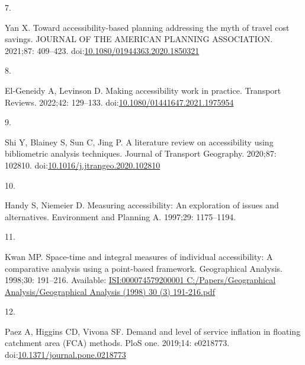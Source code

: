 \documentclass[10pt,letterpaper]{article}
\newlength{\cslhangindent}
\newlength{\csllabelwidth}
\newlength{\cslentryspacingunit} %
\newenvironment{CSLReferences}[2] %
 {%
  \setlength{\parindent}{0pt}
  \ifodd #1
  \let\oldpar\par
  \def\par{\hangindent=\cslhangindent\oldpar}
  \fi
  \setlength{\parskip}{#2\cslentryspacingunit}
 }%
 {}
\newcommand{\CSLLeftMargin}[1]{\parbox[t]{\csllabelwidth}{#1}}
\newcommand{\CSLRightInline}[1]{\parbox[t]{\linewidth - \csllabelwidth}{#1}\break}
\providecommand{\DIFaddbegin}{} %
\providecommand{\DIFaddend}{} %
\providecommand{\DIFdelbegin}{} %
\providecommand{\DIFdelend}{} %
\newcommand{\DIFscaledelfig}{0.5}
\newlength{\DIFdelgraphicswidth} %
\newlength{\DIFdelgraphicsheight} %
\newcommand{\DIFaddincludegraphics}[2][]{{\color{blue}\fbox{\DIFOincludegraphics[#1]{#2}}}} %
\newcommand{\DIFdelincludegraphics}[2][]{%
\sbox{\DIFdelgraphicsbox}{\DIFOincludegraphics[#1]{#2}}%
\settoboxwidth{\DIFdelgraphicswidth}{\DIFdelgraphicsbox} %
\settoboxtotalheight{\DIFdelgraphicsheight}{\DIFdelgraphicsbox} %
\scalebox{\DIFscaledelfig}{%
\parbox[b]{\DIFdelgraphicswidth}{\usebox{\DIFdelgraphicsbox}\\[-\baselineskip] \rule{\DIFdelgraphicswidth}{0em}}\llap{\resizebox{\DIFdelgraphicswidth}{\DIFdelgraphicsheight}{%
\setlength{\unitlength}{\DIFdelgraphicswidth}%
\begin{picture}(1,1)%
\thicklines\linethickness{2pt} %
{\color[rgb]{1,0,0}\put(0,0){\framebox(1,1){}}}%
{\color[rgb]{1,0,0}\put(0,0){\line( 1,1){1}}}%
{\color[rgb]{1,0,0}\put(0,1){\line(1,-1){1}}}%
\end{picture}%
}\hspace*{3pt}}} %
} %
\DeclareRobustCommand{\DIFaddbegin}{\DIFOaddbegin \let\includegraphics\DIFaddincludegraphics} %
\DeclareRobustCommand{\DIFaddend}{\DIFOaddend \let\includegraphics\DIFOincludegraphics} %
\DeclareRobustCommand{\DIFdelbegin}{\DIFOdelbegin \let\includegraphics\DIFdelincludegraphics} %
\DeclareRobustCommand{\DIFdelend}{\DIFOaddend \let\includegraphics\DIFOincludegraphics} %
\begin{document}
\begin{CSLReferences}{0}{0}
\leavevmode{}%
\CSLLeftMargin{7. }%
\CSLRightInline{Yan X. Toward accessibility-based planning addressing
the myth of travel cost savings. {JOURNAL} {OF} {THE} {AMERICAN}
{PLANNING} {ASSOCIATION}. 2021;87: 409--423.
doi:\href{https://doi.org/10.1080/01944363.2020.1850321}{10.1080/01944363.2020.1850321}}

\leavevmode{}%
\CSLLeftMargin{8. }%
\CSLRightInline{El-Geneidy A, Levinson D. Making accessibility work in
practice. Transport Reviews. 2022;42: 129--133.
doi:\href{https://doi.org/10.1080/01441647.2021.1975954}{10.1080/01441647.2021.1975954}}

\leavevmode{}%
\CSLLeftMargin{9. }%
\CSLRightInline{Shi Y, Blainey S, Sun C, Jing P. A literature review on
accessibility using bibliometric analysis techniques. Journal of
Transport Geography. 2020;87: 102810.
doi:\href{https://doi.org/10.1016/j.jtrangeo.2020.102810}{10.1016/j.jtrangeo.2020.102810}}

\leavevmode{}%
\CSLLeftMargin{10. }%
\CSLRightInline{Handy S, Niemeier D. Measuring accessibility: An
exploration of issues and alternatives. Environment and Planning A.
1997;29: 1175--1194. }

\leavevmode{}%
\CSLLeftMargin{11. }%
\CSLRightInline{Kwan MP. Space-time and integral measures of individual
accessibility: A comparative analysis using a point-based framework.
Geographical Analysis. 1998;30: 191--216. Available:
\href{https://ISI:000074579200001\%0AC:/Papers/Geographical\%20Analysis/Geographical\%20Analysis\%20(1998)\%2030\%20(3)\%20191-216.pdf}{ISI:000074579200001
C:/Papers/Geographical Analysis/Geographical Analysis (1998) 30 (3)
191-216.pdf}}

\leavevmode\vadjust pre{\DIFdelbegin %
\DIFdelend \DIFaddbegin \hypertarget{ref-paezDemand2019}{}\DIFaddend }%
\CSLLeftMargin{12. }%
\DIFdelbegin %
\DIFdelend \DIFaddbegin \CSLRightInline{Paez A, Higgins CD, Vivona SF. Demand and level of
service inflation in floating catchment area (FCA) methods. PloS one.
2019;14: e0218773.
doi:\href{https://doi.org/10.1371/journal.pone.0218773}{10.1371/journal.pone.0218773}}
\DIFaddend 


\end{CSLReferences}
\end{document}
